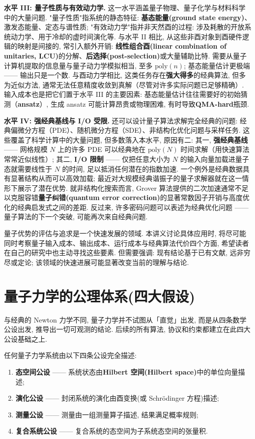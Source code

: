 \documentclass[utf8]{article} %
\numberwithin{equation}{section}   %
\newtheorem{Def}{\hskip 2em {\color{green} 定义}}[subsection]
\newtheorem{Note}{\hskip 2em {\color{red} 注}}[subsection]
\begin{document}
\textbf{水平 III: 量子性质与有效动力学.} 这一水平涵盖量子物理、量子化学与材料科学中的大量问题. "量子性质"指系统的静态特征: \textbf{基态能量(ground state energy)}、激发态能量、定态与谱性质; "有效动力学"指并非天然酉的过程: 涉及耗散的开放系统动力学、用于冷却的虚时间演化等. 与水平 II 相比, 从这些非酉对象到酉硬件逻辑的映射是间接的, 常引入额外开销: \textbf{线性组合酉(linear combination of unitaries, LCU)}的分解、\textbf{后选择(post-selection)}或大量辅助比特. 需要从量子计算机提取的信息量与量子动力学模拟相当, 至多 $\mathrm{poly}(n)$; 基态能量估计更极端 —— 输出只是一个数. 与酉动力学相比, 这类任务存在\textbf{强大得多}的经典算法, 但多为近似方法, 通常无法任意精度收敛到真解（尽管对许多实际问题已足够精确）. 输入成本也是把它们置于水平 III 的主要因素: 基态能量估计往往需要好的初始猜测（\textbf{ansatz}）, 生成 ansatz 可能计算昂贵或物理困难, 有时导致\textbf{QMA-hard}瓶颈.

\textbf{水平 IV: 强经典基线与 I/O 受限.} 还可以设计量子算法求解完全经典的问题: 经典偏微分方程（PDE）、随机微分方程（SDE）、非结构化优化问题与采样任务. 这些覆盖了科学计算中的大量问题, 但多数落入本水平, 原因有二: 其一, \textbf{强经典基线} —— 网格规模 $N$ 上的许多 PDE 可以经典地在 $\mathrm{poly}(N)$ 时间求解（用快速算法常常近似线性）; 其二, \textbf{I/O 限制} —— 仅把任意大小为 $N$ 的输入向量加载进量子态就需要线性于 $N$ 的时间, 足以抵消任何潜在的指数加速. 一个例外是经典数据具有显著结构从而可以高效加载; 最近对大规模经典谐振子的量子求解器就在这一情形下展示了潜在优势. 就非结构化搜索而言, Grover 算法提供的二次加速通常不足以克服容错\textbf{量子纠错(quantum error correction)}的显著常数因子开销与高度优化的经典启发式之间的差距. 反过来, 许多密码问题可以表述为经典优化问题 —— 量子算法的下一个突破, 可能再次来自经典问题.

\begin{Note}
    量子优势的评估与追求是一个快速发展的领域. 本讲义讨论具体应用时, 将尽可能同时考察量子输入成本、输出成本、运行成本与经典算法代价四个方面, 希望读者在自己的研究中也主动寻找这些要素. 但需要强调: 现有结论基于已有文献, 远非穷尽或定论; 该领域的快速进展可能显著改变当前的理解与结论.
\end{Note}

\section{量子力学的公理体系(四大假设)}
与经典的 Newton 力学不同, 量子力学并不试图从「直觉」出发, 而是从四条数学公设出发, 推导出一切可观测的结论. 后续的所有算法, 协议和约束都建立在此四大公设基础之上.
\begin{Def}[四大假设概述]
    任何量子力学系统由以下四条公设完全描述: 
    \begin{enumerate}[label=\textbf{公设 \arabic*: }, leftmargin=*]
    \item \textbf{态空间公设} —— 系统状态由\textbf{Hilbert 空间(Hilbert space)}中的单位向量描述;
    \item \textbf{演化公设} —— 封闭系统的演化由酉变换(或 Schrödinger 方程)描述;
    \item \textbf{测量公设} —— 测量由一组测量算子描述, 结果满足概率规则;
    \item \textbf{复合系统公设} —— 复合系统的态空间为子系统态空间的张量积.
    \end{enumerate}
\end{Def}
\end{document}
